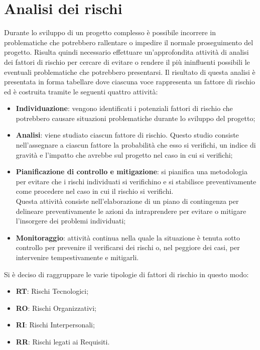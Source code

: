 \section{Analisi dei rischi}
Durante lo sviluppo di un progetto complesso è possibile incorrere in problematiche che potrebbero rallentare o impedire il normale proseguimento del progetto. Risulta quindi necessario effettuare un'approfondita attività di analisi dei fattori di rischio per cercare di evitare o rendere il più ininfluenti possibili le eventuali problematiche che potrebbero presentarsi.
Il risultato di questa analisi è presentata in forma tabellare dove ciascuna voce rappresenta un fattore di rischio ed è costruita tramite le seguenti quattro attività:
\begin{itemize}
		\item \textbf{Individuazione}: vengono identificati i potenziali fattori di rischio che potrebbero causare situazioni problematiche durante lo sviluppo del progetto;
		\item \textbf{Analisi}: viene studiato ciascun fattore di rischio. Questo studio consiste nell'assegnare a ciascun fattore la probabilità che esso si verifichi, un indice di gravità e l'impatto che avrebbe sul progetto nel caso in cui si verifichi;
		\item \textbf{Pianificazione di controllo e mitigazione}: si pianifica una metodologia per evitare che i rischi individuati si verifichino e si stabilisce preventivamente come procedere nel caso in cui il rischio si verifichi. \\
		Questa attività consiste nell'elaborazione di un piano di contingenza per delineare preventivamente le azioni da intraprendere per evitare o mitigare l'insorgere dei problemi individuati;
		\item \textbf{Monitoraggio}: attività continua nella quale la situazione è tenuta sotto controllo per prevenire il verificarsi dei rischi o, nel peggiore dei casi, per intervenire tempestivamente e mitigarli. \\

\end{itemize}


Si è deciso di raggruppare le varie tipologie di fattori di rischio in questo modo:
\begin{itemize}
	\item \textbf{RT}: Rischi Tecnologici;
	\item \textbf{RO}: Rischi Organizzativi;
	\item \textbf{RI}: Rischi Interpersonali;
	\item \textbf{RR}: Rischi legati ai Requisiti.
\end{itemize}

